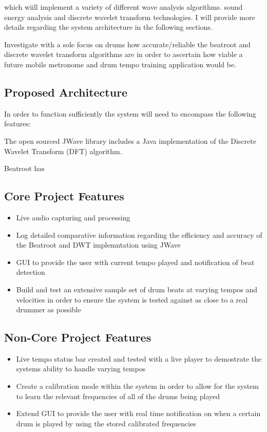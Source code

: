 \documentclass[a4paper, 11pt]{article}
\begin{document}
 which wiill implement a variety of different wave analysis algorithms. sound energy analysis and discrete wavelet transform technologies. I will provide more details regarding the system architecture in the following sections. 

Investigate with a sole focus on drums how accurate/reliable the beatroot and discrete wavelet transform algorithms are in order to ascertain how viable a future mobile metronome and drum tempo training application would be.



\subsection{Proposed Architecture}
In order to function sufficiently the system will need to encompass the following features:

The open sourced JWave library includes a Java implementation of the Discrete Wavelet Transform (DFT) algorithm.

Beatroot has 

\subsection{Core Project Features}
\begin{itemize}
\item Live audio capturing and processing
\item Log detailed comparative information regarding the efficiency and accuracy of the Beatroot and DWT implemntation using JWave
\item GUI to provide the user with current tempo played and notification of beat detection
\item Build and test an extensive sample set of drum beats at varying tempos and velocities in order to ensure the system is tested against as close to a real drummer as possible
\end{itemize}

\subsection{Non-Core Project Features}
\begin{itemize}
\item Live tempo status bar created and tested with a live player to demostrate the systems ability to handle varying tempos
\item Create a calibration mode within the system in order to allow for the system to learn the relevant frequencies of all of the drums being played
\item Extend GUI to provide the user with real time notification on when a certain drum is played by using the stored calibrated frequencies
\end{itemize}
\end{document}
